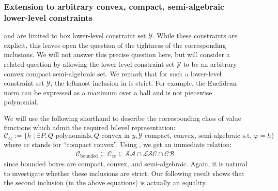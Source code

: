 \documentclass{article}
\newcommand*{\cC}{\mathcal{C}}
\newcommand*{\cY}{\mathcal{Y}}
\newcommand{\SA}{\mathcal{SA}}
\newcommand{\LSC}{\mathcal{LSC}}
\newcommand{\BC}{\mathcal{CB}}
\newcommand{\bounded}{\text{bounded}}
\newcommand{\coco}{\text{cc}}
\newcommand{\valbilevel}{\varphi}
\theoremstyle{plain}
\theoremstyle{definition}
\begin{document}
\subsubsection{Extension to arbitrary convex, compact, semi-algebraic lower-level constraints}

 and  are limited to box lower-level constraint set $\cY$. While these constraints are explicit, this leaves open the question of the tightness of the corresponding inclusions. We will not answer this precise question here, but will consider a related question by allowing the lower-level constraint set $\cY$ to be an arbitrary convex compact semi-algebraic set. We remark that for such a lower-level constraint set $\cY$, the leftmost inclusion in  is strict. For example, the Euclidean norm can be expressed as a maximum over a ball and is not piecewise polynomial.


We will use the following shorthand to describe the corresponding class of value functions which admit the required bilevel representation:
\begin{equation}
    \label{eq:convex-compact-class}
    \cC_{\coco} := \{h \mid \exists P, Q \text{ polynomials}, Q \text{ convex in } y, \cY \text{ compact, convex, semi-algebraic s.t. } \valbilevel = h\}
\end{equation}
where $\coco$ stands for ``compact convex''. Using , we get an immediate relation:
\begin{equation*}
    \begin{aligned}
        \cC_{\bounded} \subseteq \cC_{\coco} \subseteq \SA \cap \LSC \cap \BC.
    \end{aligned}
\end{equation*}
since bounded boxes are compact, convex, and semi-algebraic. Again, it is natural to investigate whether these inclusions are strict. Our following result shows that the second inclusion (in the above equations) is actually an equality.
\end{document}

